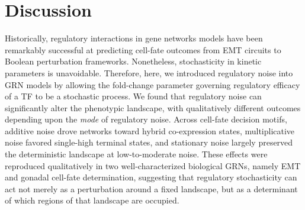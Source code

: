 \documentclass[11pt]{article}
\begin{document}

\section{Discussion}

Historically, regulatory interactions in gene networks models have been remarkably successful at predicting cell-fate outcomes from EMT circuits to Boolean perturbation frameworks. Nonetheless, stochasticity in kinetic parameters is unavoidable. Therefore, here, we introduced regulatory noise into GRN models by allowing the fold-change parameter governing regulatory efficacy of a TF to be a stochastic process. We found that regulatory noise can significantly alter the phenotypic landscape, with qualitatively different outcomes depending upon the \emph{mode} of regulatory noise. Across cell-fate decision motifs, additive noise drove networks toward hybrid co-expression states, multiplicative noise favored single-high terminal states, and stationary noise largely preserved the deterministic landscape at low-to-moderate noise. These effects were reproduced qualitatively in two well-characterized biological GRNs, namely EMT and gonadal cell-fate determination, suggesting that regulatory stochasticity can act not merely as a perturbation around a fixed landscape, but as a determinant of which regions of that landscape are occupied.
\end{document}
